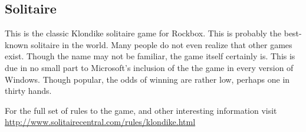 \subsection{Solitaire}

This is the classic Klondike solitaire game for Rockbox.
This is probably the best-known solitaire in the world. Many people 
do not even realize that other games exist. Though the name may not 
be familiar, the game itself certainly is. This is due in no small 
part to Microsoft's inclusion of the the game in every version of 
Windows. Though popular, the odds of winning are rather low, perhaps 
one in thirty hands.

For the full set of rules to the game, and other interesting information
visit
\url{http://www.solitairecentral.com/rules/klondike.html}

